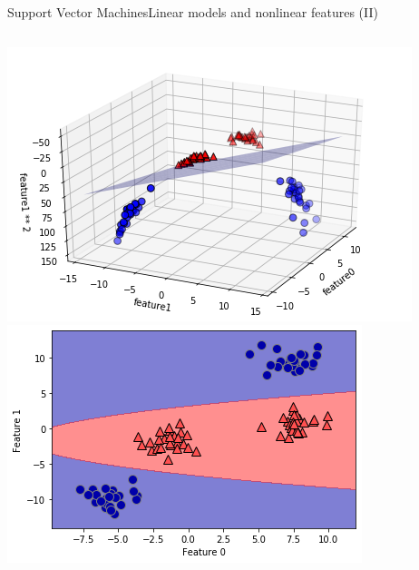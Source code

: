\documentclass[10pt,compress]{beamer} %
\begin{document}
\begin{frame}{Support Vector Machines}{Linear models and nonlinear features (II)}
    \begin{columns}[T]
            \includegraphics[width=\linewidth]{figs/svm-3.png}
            \includegraphics[width=\linewidth]{figs/svm-4.png}
    \end{columns}
\end{frame}
\end{document}
